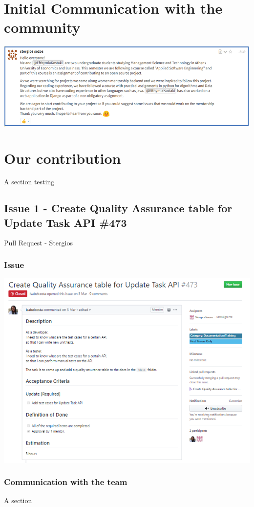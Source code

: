 \documentclass{article}
\begin{document}
\section{Initial Communication with the community}
\includegraphics{FirstCommunication.png}

\section{Our contribution}
A section testing 

\subsection{Issue 1 - Create Quality Assurance table for Update Task API \#473}
Pull Request - Stergios

\subsubsection{Issue}
\includegraphics{issue473}

\subsubsection{Communication with the team}
A section
\end{document}
